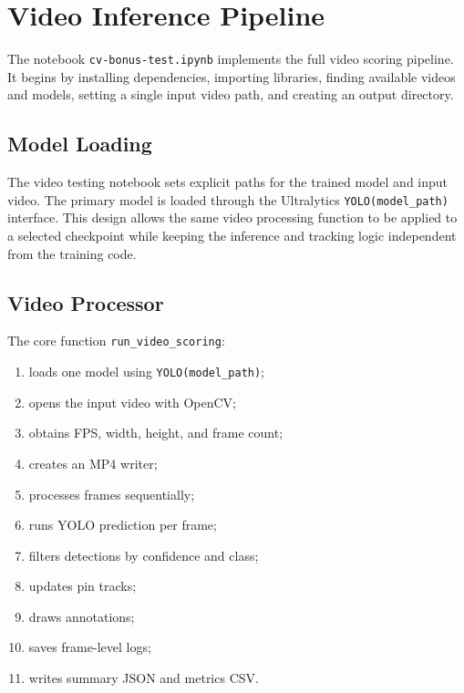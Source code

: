 \documentclass[12pt,a4paper]{article}
\begin{document}
\section{Video Inference Pipeline}

The notebook \texttt{cv-bonus-test.ipynb} implements the full video scoring pipeline. It begins by installing dependencies, importing libraries, finding available videos and models, setting a single input video path, and creating an output directory.


\subsection{Model Loading}

The video testing notebook sets explicit paths for the trained model and input video. The primary model is loaded through the Ultralytics \texttt{YOLO(model\_path)} interface. This design allows the same video processing function to be applied to a selected checkpoint while keeping the inference and tracking logic independent from the training code.

\subsection{Video Processor}

The core function \texttt{run\_video\_scoring}:
\begin{enumerate}[noitemsep]
    \item loads one model using \texttt{YOLO(model\_path)};
    \item opens the input video with OpenCV;
    \item obtains FPS, width, height, and frame count;
    \item creates an MP4 writer;
    \item processes frames sequentially;
    \item runs YOLO prediction per frame;
    \item filters detections by confidence and class;
    \item updates pin tracks;
    \item draws annotations;
    \item saves frame-level logs;
    \item writes summary JSON and metrics CSV.
\end{enumerate}
\end{document}
